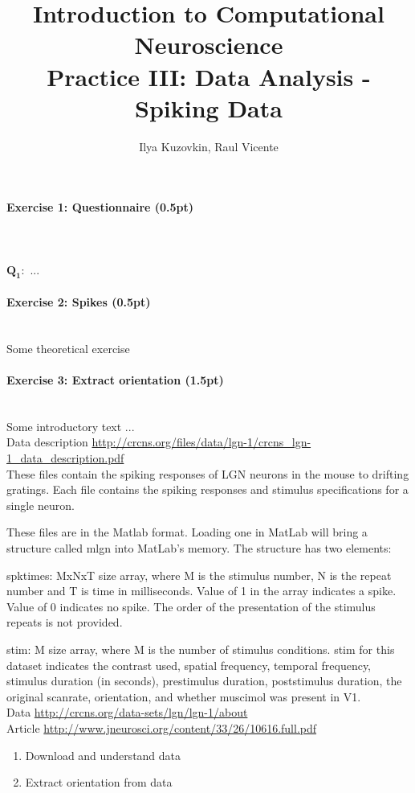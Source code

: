 \documentclass[a4paper,11pt]{article}
\author{\large{Ilya Kuzovkin, Raul Vicente}}
\title{\huge{Introduction to Computational Neuroscience}\\\LARGE{Practice III: Data Analysis - Spiking Data}}
\newenvironment{exercise}[3]{\paragraph{Exercise #1: #2 (#3pt)}\ \\}{
\medskip}
\newcommand{\question}[2]{\setlength\parindent{0mm}\ \\$\mathbf{Q_#1:}$ #2\ \\}
\begin{document}
\maketitle

\begin{exercise}{1}{Questionnaire}{0.5}
\question{1}{...}
\end{exercise}

\begin{exercise}{2}{Spikes}{0.5}
Some theoretical exercise
\end{exercise}

\begin{exercise}{3}{Extract orientation}{1.5}
Some introductory text ...\\
Data description \url{http://crcns.org/files/data/lgn-1/crcns_lgn-1_data_description.pdf}\\

These files contain the spiking responses of LGN neurons in the mouse to 
drifting gratings. Each file contains the spiking responses and stimulus 
specifications for a single neuron. 
 
These files are in the Matlab format. Loading one in MatLab will bring a structure 
called mlgn into MatLab's memory. The structure has two elements: 
 
spktimes: MxNxT size array, where M is the stimulus number, N is the repeat 
number and T is time in milliseconds. Value of 1 in the array indicates 
a spike. Value of 0 indicates no spike. The order of the presentation 
of the stimulus repeats is not provided. 
 
stim: M size array, where M is the number of stimulus conditions. 
stim for this dataset indicates the contrast used, spatial frequency, 
temporal frequency, stimulus duration (in seconds), prestimulus 
duration, poststimulus duration, the original scanrate, orientation, and 
whether muscimol was present in V1. 
\ \\



Data \url{http://crcns.org/data-sets/lgn/lgn-1/about}\\
Article \url{http://www.jneurosci.org/content/33/26/10616.full.pdf}
\begin{enumerate}
\itemsep 0em
	\item Download and understand data
	\item Extract orientation from data
\end{enumerate}
\end{exercise}
\end{document}
